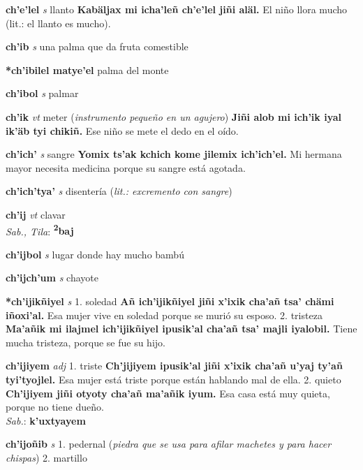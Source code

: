 \documentclass[10pt]{scrbook}
\newcommand{\entry}[1]{\textbf{#1}}
\newcommand{\onedefinition}[1]{#1.}
\newcommand{\partofspeech}[1]{\textit{#1}}
\newcommand{\spanishtranslation}[1]{#1}
\newcommand{\clarification}[1]{(\textit{#1})}
\newcommand{\cholexample}[1]{\textbf{#1}}
\newcommand{\exampletranslation}[1]{#1}
\newcommand{\dialectvariant}[1]{\\\textit{#1}:}
\newcommand{\dialectword}[1]{\textbf{#1}}
\begin{document}
\begin{multicols}{2}
\entry{ch'e'lel}
\partofspeech{s}
\spanishtranslation{llanto}
\cholexample{Kabäljax mi icha'leñ ch'e'lel jiñi aläl.}
\exampletranslation{El niño llora mucho (lit.: el llanto es mucho).}

\entry{ch'ib}
\partofspeech{s}
\spanishtranslation{una palma que da fruta comestible}

\entry{*ch'ibilel matye'el}
\spanishtranslation{palma del monte}

\entry{ch'ibol}
\partofspeech{s}
\spanishtranslation{palmar}

\entry{ch'ik}
\partofspeech{vt}
\spanishtranslation{meter}
\clarification{instrumento pequeño en un agujero}
\cholexample{Jiñi alob mi ich'ik iyal ik'äb tyi chikiñ.}
\exampletranslation{Ese niño se mete el dedo en el oído.}

\entry{ch'ich'}
\partofspeech{s}
\spanishtranslation{sangre}
\cholexample{Yomix ts'ak kchich kome jilemix ich'ich'el.}
\exampletranslation{Mi hermana mayor necesita medicina porque su sangre está agotada.}

\entry{ch'ich'tya'}
\partofspeech{s}
\spanishtranslation{disentería}
\clarification{lit.: excremento con sangre}

\entry{ch'ij}
\partofspeech{vt}
\spanishtranslation{clavar}
\dialectvariant{Sab., Tila}
\dialectword{\textsuperscript{2}baj}

\entry{ch'ijbol}
\partofspeech{s}
\spanishtranslation{lugar donde hay mucho bambú}

\entry{ch'ijch'um}
\partofspeech{s}
\spanishtranslation{chayote}

\entry{*ch'ijikñiyel}
\partofspeech{s}
\onedefinition{1}
\spanishtranslation{soledad}
\cholexample{Añ ich'ijikñiyel jiñi x'ixik cha'añ tsa' chämi iñoxi'al.}
\exampletranslation{Esa mujer vive en soledad porque se murió su esposo.}
\onedefinition{2}
\spanishtranslation{tristeza}
\cholexample{Ma'añik mi ilajmel ich'ijikñiyel ipusik'al cha'añ tsa' majli iyalobil.}
\exampletranslation{Tiene mucha tristeza, porque se fue su hijo.}

\entry{ch'ijiyem}
\partofspeech{adj}
\onedefinition{1}
\spanishtranslation{triste}
\cholexample{Ch'jijiyem ipusik'al jiñi x'ixik cha'añ u'yaj ty'añ tyi'tyojlel.}
\exampletranslation{Esa mujer está triste porque están hablando mal de ella.}
\onedefinition{2}
\spanishtranslation{quieto}
\cholexample{Ch'ijiyem jiñi otyoty cha'añ ma'añik iyum.}
\exampletranslation{Esa casa está muy quieta, porque no tiene dueño.}
\dialectvariant{Sab.}
\dialectword{k'uxtyayem}

\entry{ch'ijoñib}
\partofspeech{s}
\onedefinition{1}
\spanishtranslation{pedernal}
\clarification{piedra que se usa para afilar machetes y para hacer chispas}
\onedefinition{2}
\spanishtranslation{martillo}


\end{multicols}
\end{document}
